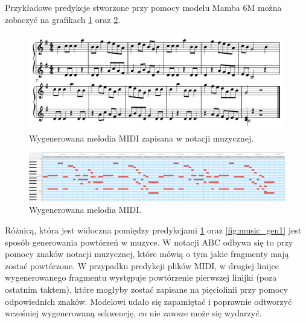 \documentclass[data-science]{agh-wi} %
\begin{document}
Przykładowe predykcje stworzone przy pomocy modelu Mamba 6M można zobaczyć na grafikach \ref*{fig:music_genMIDI_notes} oraz \ref*{fig:music_genMIDI}.

\begin{figure}[ht!]
    \begin{center}
        \includegraphics[width=0.9\linewidth]{./img/35.pdf}
    \end{center}
    \caption{Wygenerowana melodia MIDI zapisana w notacji muzycznej.}\label{fig:music_genMIDI_notes}
\end{figure}

\begin{figure}[ht!]
    \begin{center}
        \includegraphics[width=0.9\linewidth]{./img/midi_generated.png}
    \end{center}
    \caption{Wygenerowana melodia MIDI.}\label{fig:music_genMIDI}
\end{figure}

Różnicą, która jest widoczna pomiędzy predykcjami \ref*{fig:music_genMIDI_notes} oraz \ref*{fig:music_gen1} jest sposób generowania powtórzeń w muzyce. W notacji ABC odbywa się to przy pomocy znaków notacji muzycznej, które mówią o tym jakie fragmenty mają zostać powtórzone. W przypadku predykcji plików MIDI, w drugiej linijce wygenerowanego fragmentu występuje powtórzenie pierwszej linijki (poza ostatnim taktem), które mogłyby zostać zapisane na pięciolinii przy pomocy odpowiednich znaków. Modelowi udało się zapamiętać i poprawnie odtworzyć wcześniej wygenerowaną sekwencję, co nie zawsze może się wydarzyć.
\end{document}
